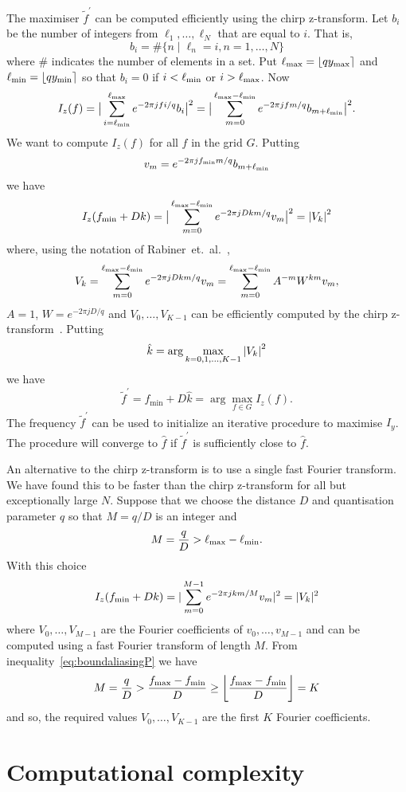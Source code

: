 \documentclass[10pt,twocolumn,twoside]{IEEEtran}
\begin{document}
The maximiser $\widetilde{f}^\prime$ can be computed efficiently using the chirp z-transform.  Let $b_i$ be the number of integers from $\ell_1,\dots,\ell_N$ that are equal to $i$.  That is,
\[
b_i= \#\{ n \mid \ell_n = i, n = 1,\dots, N\}
\]
where $\#$ indicates the number of elements in a set.  Put $\ell_{\text{max}} = {\left\lfloor q y_{\text{max}} \right\rceil}$ and $\ell_{\text{min}} = {\left\lfloor q y_{\text{min}} \right\rceil}$ so that $b_i = 0$ if $i < \ell_{\text{min}}$ or $i > \ell_{\text{max}}$.  Now
\[
I_z(f) = \big\vert  \sum_{i = \ell_{\text{min}}}^{\ell_{\text{max}}} e^{ -2\pi j f i/q} b_i  \big\vert^2 = \big\vert  \sum_{m = 0}^{\ell_{\text{max}}-\ell_{\text{min}}} e^{ -2\pi j f m/q} b_{m+\ell_{\text{min}}}  \big\vert^2.
\]
We want to compute $I_z(f)$ for all $f$ in the grid $G$.  Putting
\[
v_m = e^{ -2\pi j f_{\text{min}}m/q} b_{m+\ell_{\text{min}}}
\]
we have
\[
I_z(f_{\text{min}} + Dk) = \big\vert  \sum_{m = 0}^{\ell_{\text{max}}-\ell_{\text{min}}} e^{ -2\pi j Dk m/q} v_m  \big\vert^2 = \left\vert V_k \right\vert^2
\]   
where, using the notation of Rabiner~et.~al.~\cite[eq.~(10)]{Rabiner1969},
\[
V_k = \sum_{m = 0}^{\ell_{\text{max}}-\ell_{\text{min}}} e^{ -2\pi j Dk m/q} v_m = \sum_{m=0}^{\ell_{\text{max}}-\ell_{\text{min}}} A^{-m} W^{km} v_m,
\]
$A = 1$, $W = e^{ -2\pi j D/q}$ and $V_0,\dots,V_{K-1}$ can be efficiently computed by the chirp z-transform~\cite{Rabiner1969}.  Putting
\[
\hat{k} = \arg\max_{k = 0,1,\dots,K-1} \left\vert  V_k  \right\vert^2
\]
we have
\[ 
\widetilde{f}^\prime = f_{\text{min}} + D\hat{k} = \arg\max_{f \in G} I_z(f).
\]
The frequency $\widetilde{f}^\prime$ can be used to initialize an iterative procedure to maximise $I_y$.  The procedure will converge to $\hat{f}$ if $\widetilde{f}^\prime$ is sufficiently close to $\hat{f}$.

An alternative to the chirp z-transform is to use a single fast Fourier transform.  We have found this to be faster than the chirp z-transform for all but exceptionally large $N$.  Suppose that we choose the distance $D$ and quantisation parameter $q$ so that $M = q/D$ is an integer and
\[
M = \frac{q}{D} > \ell_{\text{max}}-\ell_{\text{min}}.
\]
With this choice
\[
I_z(f_{\text{min}} + Dk) = \vert \sum_{m = 0}^{M-1} e^{-2\pi j k m/M} v_m \vert^2 = \vert V_k \vert^2
\]
where $V_0,\dots,V_{M-1}$ are the Fourier coefficients of $v_0,\dots,v_{M-1}$ and can be computed using a fast Fourier transform of length $M$.  From inequality~\eqref{eq:boundaliasingP} we have
\[
M = \frac{q}{D} > \frac{f_{\text{max}} - f_{\text{min}}}{D} \geq {\left\lfloor \frac{f_{\text{max}} - f_{\text{min}}}{D} \right\rfloor} = K
\]
and so, the required values  $V_0,\dots,V_{K-1}$ are the first $K$ Fourier coefficients.


\section{Computational complexity}\label{sec:comp-compl}
\end{document}
